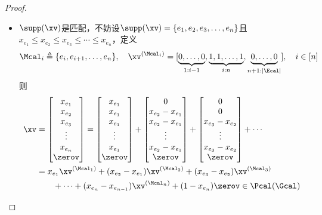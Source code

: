 \documentclass{ctexart}
\begin{document}
\begin{proof}
\begin{itemize}
        \item $\supp(\xv)$是匹配，不妨设$\supp(\xv) = \{ e_1, e_2, e_3, \ldots, e_n \}$且$x_{e_1} \le x_{e_2} \le x_{e_3} \le \cdots \le x_{e_n}$，定义
              \begin{align*}
                  \Mcal_i \triangleq \{ e_i, e_{i+1}, \ldots, e_n \}, \quad \xv^{(\Mcal_i)} = [\underbrace{0, \ldots, 0}_{1:i-1}, \underbrace{1, 1, \ldots, 1}_{i:n}, \underbrace{0, \ldots, 0}_{n+1:|\Ecal|}], \quad i \in [n]
              \end{align*}
              则
              \begin{align*}
                  \xv & = \begin{bmatrix}
                      x_{e_1} \\ x_{e_2} \\ x_{e_3} \\ \vdots \\ x_{e_n} \\ \zerov
                  \end{bmatrix} = \begin{bmatrix}
                      x_{e_1} \\ x_{e_1} \\ x_{e_1} \\ \vdots \\ x_{e_1} \\ \zerov
                  \end{bmatrix} + \begin{bmatrix}
                      0 \\ x_{e_2} - x_{e_1} \\ x_{e_2} - x_{e_1} \\ \vdots \\ x_{e_2} - x_{e_1} \\ \zerov
                  \end{bmatrix} + \begin{bmatrix}
                      0 \\ 0 \\ x_{e_3} - x_{e_2} \\ \vdots \\ x_{e_3} - x_{e_2} \\ \zerov
                  \end{bmatrix} + \cdots \\
                      & = x_{e_1} \xv^{(\Mcal_1)} + (x_{e_2} - x_{e_1}) \xv^{(\Mcal_2)} + (x_{e_3} - x_{e_2}) \xv^{(\Mcal_3)}                       \\
                      & \qquad + \cdots + (x_{e_n} - x_{e_{n-1}}) \xv^{(\Mcal_n)} + (1 - x_{e_n}) \zerov \in \Pcal (\Gcal)
              \end{align*}
    \end{itemize}
\end{proof}
\end{document}
